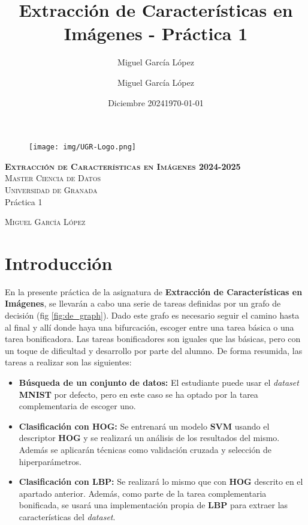 \documentclass[12pt,letterpaper]{article}
\title{Extracción de Características en Imágenes - Práctica 1}
\author{Miguel García López}
\date{Diciembre 2024}
\author{Miguel García López} %
\date{\normalsize\today} %
\begin{document}
\begin{titlepage}
\begin{figure}
    \vspace{-1.3cm}
    \begin{center}
        \texttt{[image: img/UGR-Logo.png]}
    \end{center}
\end{figure}
\vspace{1.3cm}
\centering
\normalfont \normalsize
\textsc{\textbf{Extracción de Características en Imágenes 2024-2025} \\ \vspace{.15cm} Master Ciencia de Datos\\ \vspace{.15cm} Universidad de Granada} \\ [25pt] 
    \huge Práctica 1

\normalfont \normalsize \vspace{.30cm}
\textsc{Miguel García López}

\end{titlepage}

\tableofcontents
\listoffigures
\listoftables
\newpage

\section{Introducción}
En la presente práctica de la asignatura de \textbf{Extracción de Características en Imágenes}, se llevarán a cabo una serie de tareas definidas por un grafo de decisión (fig \ref{fig:de_graph}). Dado este grafo es necesario seguir el camino hasta al final y allí donde haya una bifurcación, escoger entre una tarea básica o una tarea bonificadora. Las tareas bonificadores son iguales que las básicas, pero con un toque de dificultad y desarrollo por parte del alumno. De forma resumida, las tareas a realizar son las siguientes: 

\begin{itemize}
    \item \textbf{Búsqueda de un conjunto de datos:} El estudiante puede usar el \textit{dataset} \textbf{MNIST} por defecto, pero en este caso se ha optado por la tarea complementaria de escoger uno.
    \item \textbf{Clasificación con HOG:} Se entrenará un modelo \textbf{SVM} usando el descriptor \textbf{HOG} y se realizará un análisis de los resultados del mismo. Además se aplicarán técnicas como validación cruzada y selección de hiperparámetros.
    \item \textbf{Clasificación con LBP:} Se realizará lo mismo que con \textbf{HOG} descrito en el apartado anterior. Además, como parte de la tarea complementaria bonificada, se usará una implementación propia de \textbf{LBP} para extraer las características del \textit{dataset}.
\end{itemize}
\end{document}
